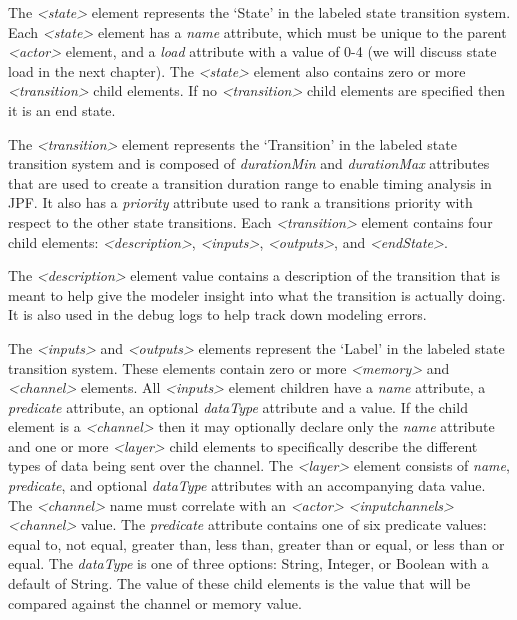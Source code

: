 The {\em \textless state\textgreater} element represents the `State' in the labeled state transition system.  Each {\em \textless state\textgreater} element has a {\em name} attribute, which must be unique to the parent {\em \textless actor\textgreater} element, and a {\em load} attribute with a value of 0-4 (we will discuss state load in the next chapter).  The {\em \textless state\textgreater} element also contains zero or more {\em \textless transition\textgreater} child elements.  If no {\em \textless transition\textgreater} child elements are specified then it is an end state.  

The {\em \textless transition\textgreater} element represents the `Transition' in the labeled state transition system and is composed of {\em durationMin} and {\em durationMax} attributes that are used to create a transition duration range to enable timing analysis in JPF.  It also has a {\em priority} attribute used to rank a transitions priority with respect to the other state transitions.  Each {\em \textless transition\textgreater} element contains four child elements: {\em \textless description\textgreater}, {\em \textless inputs\textgreater}, {\em \textless outputs\textgreater}, and {\em \textless endState\textgreater}.  

The {\em \textless description\textgreater} element value contains a description of the transition that is meant to help give the modeler insight into what the transition is actually doing.  It is also used in the debug logs to help track down modeling errors.  

The {\em \textless inputs\textgreater} and {\em \textless outputs\textgreater} elements represent the `Label' in the labeled state transition system.  These elements contain zero or more {\em \textless memory\textgreater} and {\em \textless channel\textgreater} elements.  All {\em \textless inputs\textgreater} element children have a {\em name} attribute, a {\em predicate} attribute, an optional {\em dataType} attribute and a value.  If the child element is a {\em \textless channel\textgreater} then it may optionally declare only the {\em name} attribute and one or more {\em \textless layer\textgreater} child elements to specifically describe the different types of data being sent over the channel.  The {\em \textless layer\textgreater} element consists of {\em name}, {\em predicate}, and optional {\em dataType} attributes with an accompanying data value.  The {\em \textless channel\textgreater} name must correlate with an {\em \textless actor\textgreater} {\em \textless inputchannels\textgreater} {\em \textless channel\textgreater} value.  The {\em predicate} attribute contains one of six predicate values: equal to, not equal, greater than, less than, greater than or equal, or less than or equal.  The {\em dataType} is one of three options: String, Integer, or Boolean with a default of String.  The value of these child elements is the value that will be compared against the channel or memory value.  

